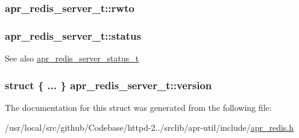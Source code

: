 \subsubsection[{\texorpdfstring{rwto}{rwto}}]{ apr\+\_\+redis\+\_\+server\+\_\+t\+::rwto}\hypertarget{structapr__redis__server__t_a48b7193b08172986eab8494fcdc9d3a5}{}\label{structapr__redis__server__t_a48b7193b08172986eab8494fcdc9d3a5}
\subsubsection[{\texorpdfstring{status}{status}}]{ apr\+\_\+redis\+\_\+server\+\_\+t\+::status}\hypertarget{structapr__redis__server__t_a8566fd8aa341fa2a3b4acaa568b2a607}{}\label{structapr__redis__server__t_a8566fd8aa341fa2a3b4acaa568b2a607}
\begin{DoxySeeAlso}{See also}
\hyperlink{group__APR__Util__RC_gaab66b126b216452bfae7e27f1ecdff8d}{apr\+\_\+redis\+\_\+server\+\_\+status\+\_\+t} 
\end{DoxySeeAlso}
\subsubsection[{\texorpdfstring{version}{version}}]{\setlength{\rightskip}{0pt plus 5cm}struct \{ ... \}   apr\+\_\+redis\+\_\+server\+\_\+t\+::version}\hypertarget{structapr__redis__server__t_a503a37eea23ac6da45bdccb95b664e60}{}\label{structapr__redis__server__t_a503a37eea23ac6da45bdccb95b664e60}


The documentation for this struct was generated from the following file\+:\begin{DoxyCompactItemize}
\item 
/usr/local/src/github/\+Codebase/httpd-\/2../srclib/apr-\/util/include/\hyperlink{apr__redis_8h}{apr\+\_\+redis.\+h}\end{DoxyCompactItemize}
